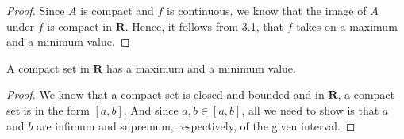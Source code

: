 
    \begin{solution}
        
        \begin{proof}
            Since $A$ is compact and $f$ is continuous, we
            know that the image of $A$ under $f$ is compact
            in $\mathbf{R}$. Hence, it follows from 3.1,
            that $f$ takes on a maximum and a minimum value.
        \end{proof}

        \begin{lemma}
            A compact set in $\mathbf{R}$ has a maximum
            and a minimum value.
            \begin{proof}
                We know that a compact set is closed and
                bounded and in $\mathbf{R}$, a compact set
                is in the form $[a,b]$. And since $a, b \in
                [a,b]$, all we need to show is that $a$ and
                $b$ are infimum and supremum, respectively,
                of the given interval.
            \end{proof}
        \end{lemma}
    \end{solution}